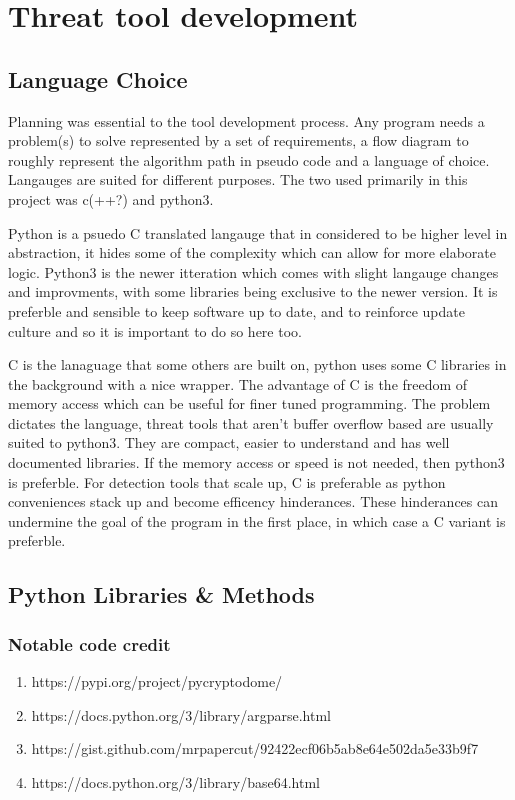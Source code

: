 
\chapter{Threat tool development}
\section{Language Choice}
Planning was essential to the tool development process. Any program needs a problem(s) to solve represented by a set of requirements, a flow diagram to roughly represent the algorithm path in pseudo code and a language of choice.
Langauges are suited for different purposes. The two used primarily in this project was c(++?) and python3. 

Python is a psuedo C translated langauge that in considered to be higher level in abstraction, it hides some of the complexity which can allow for 
more elaborate logic. Python3 is the newer itteration which comes with slight langauge changes and improvments, with some libraries being exclusive to the newer version. It is preferble and sensible to keep software up to date, and to reinforce update culture and so it is important to do so here too.

C is the lanaguage that some others are built on, python uses some C libraries in the background with a nice wrapper. The advantage of C is the freedom of memory access which can be useful for finer tuned programming. The problem dictates the language, threat tools that aren't buffer overflow based are usually suited to python3.
They are compact, easier to understand and has well documented libraries. If the memory access or speed is not needed, then python3 is preferble. For detection tools that scale up, C is preferable as python conveniences stack up and become efficency hinderances. These hinderances can undermine the goal of the program in the first place, in which case a C variant is preferble.

\section{Python Libraries & Methods}
\subsection{Notable code credit}
\begin{enumerate}
    \item https://pypi.org/project/pycryptodome/
    \item https://docs.python.org/3/library/argparse.html
    \item https://gist.github.com/mrpapercut/92422ecf06b5ab8e64e502da5e33b9f7
    \item https://docs.python.org/3/library/base64.html
\end{enumerate}

